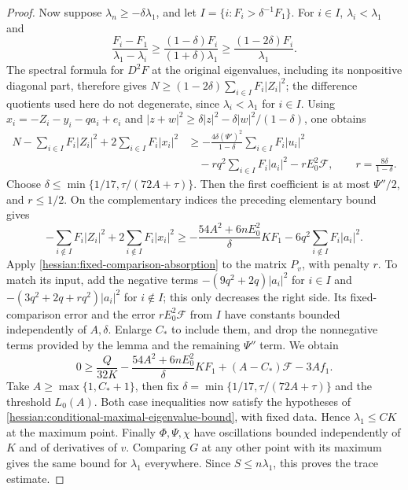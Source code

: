 \begin{proof}
Now suppose $\lambda_n\geq-\delta\lambda_1$, and let $I=\{i:F_i>\delta^{-1}F_1\}$. For $i\in I$, $\lambda_i<\lambda_1$ and
\[
 \frac{F_i-F_1}{\lambda_1-\lambda_i}
       \geq\frac{(1-\delta)F_i}{(1+\delta)\lambda_1}
       \geq\frac{(1-2\delta)F_i}{\lambda_1}.
\]
The spectral formula for $D^2F$ at the original eigenvalues, including its nonpositive diagonal part, therefore gives $N\geq(1-2\delta)\sum_{i\in I}F_i|Z_i|^2$; the difference quotients used here do not degenerate, since $\lambda_i<\lambda_1$ for $i\in I$.
Using $x_i=-Z_i-y_i-qa_i+e_i$ and $|z+w|^2\geq\delta|z|^2-\delta|w|^2/(1-\delta)$, one obtains
\begin{align*}
 N-\sum_{i\in I}F_i|Z_i|^2+2\sum_{i\in I}F_i|x_i|^2
 &\geq-\frac{4\delta(\Psi')^2}{1-\delta}\sum_{i\in I}F_i|u_i|^2\\
 &\quad-r q^2\sum_{i\in I}F_i|a_i|^2-rE_0^2\mathcal F,
 \qquad r=\frac{8\delta}{1-\delta}.
\end{align*}
Choose $\delta\leq\min\{1/17,\tau/(72A+\tau)\}$. Then the first coefficient is at most $\Psi''/2$, and $r\leq1/2$. On the complementary indices the preceding elementary bound gives
\[
 -\sum_{i\notin I}F_i|Z_i|^2+2\sum_{i\notin I}F_i|x_i|^2
 \geq-\frac{54A^2+6nE_0^2}{\delta}KF_1
       -6q^2\sum_{i\notin I}F_i|a_i|^2.
\]
Apply \cref{hessian:fixed-comparison-absorption} to the matrix $P_v$, with penalty $r$. To match its input, add the negative terms $-(9q^2+2q)|a_i|^2$ for $i\in I$ and $-(3q^2+2q+rq^2)|a_i|^2$ for $i\notin I$; this only decreases the right side. Its fixed-comparison error and the error $rE_0^2\mathcal F$ from $I$ have constants bounded independently of $A,\delta$. Enlarge $C_*$ to include them, and drop the nonnegative terms provided by the lemma and the remaining $\Psi''$ term. We obtain
\[
 0\geq\frac{Q}{32K}-\frac{54A^2+6nE_0^2}{\delta}KF_1
                +(A-C_*)\mathcal F-3Af_1.
\]
Take $A\geq\max\{1,C_*+1\}$, then fix $\delta=\min\{1/17,\tau/(72A+\tau)\}$ and the threshold $L_0(A)$. Both case inequalities now satisfy the hypotheses of \cref{hessian:conditional-maximal-eigenvalue-bound}, with fixed data. Hence $\lambda_1\leq CK$ at the maximum point.
Finally $\Phi,\Psi,\chi$ have oscillations bounded independently of $K$ and of derivatives of $v$. Comparing $G$ at any other point with its maximum gives the same bound for $\lambda_1$ everywhere. Since $S\leq n\lambda_1$, this proves the trace estimate.
\end{proof}

